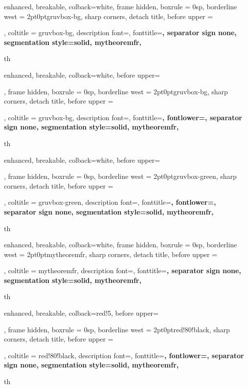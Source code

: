 {
	enhanced,
	breakable,
	colback=white,
	frame hidden,
	boxrule = 0sp,
	borderline west = {2pt}{0pt}{gruvbox-bg},
	sharp corners,
	detach title,
	before upper = \tcbtitle\par\smallskip,
	coltitle = gruvbox-bg,
	description font=\mdseries{}\selectfont,
	fonttitle=\selectfont\bfseries,
	separator sign none,
	segmentation style={solid, mytheoremfr},
}
{th}


{
	enhanced,
	breakable,
	colback=white,
  before upper=\tcbtitle\par\Hugeskip,
	frame hidden,
	boxrule = 0sp,
	borderline west = {2pt}{0pt}{gruvbox-bg},
	sharp corners,
	detach title,
	before upper = \tcbtitle\par\smallskip,
	coltitle = gruvbox-bg,
	description font=\mdseries{}\selectfont,
	fonttitle=\selectfont\bfseries,
	fontlower=\selectfont,
  separator sign none,
	segmentation style={solid, mytheoremfr},
}
{th}

{
	enhanced,
	breakable,
	colback=white,
  before upper=\tcbtitle\par\Hugeskip,
	frame hidden,
	boxrule = 0sp,
	borderline west = {2pt}{0pt}{gruvbox-green},
	sharp corners,
	detach title,
	before upper = \tcbtitle\par\smallskip,
	coltitle = gruvbox-green,
	description font=\mdseries{}\selectfont,
	fonttitle=\selectfont\bfseries,
	fontlower=\selectfont,
  separator sign none,
	segmentation style={solid, mytheoremfr},
}
{th}

{
	enhanced,
	breakable,
	colback=white,
	frame hidden,
	boxrule = 0sp,
	borderline west = {2pt}{0pt}{mytheoremfr},
	sharp corners,
	detach title,
	before upper = \tcbtitle\par\smallskip,
	coltitle = mytheoremfr,
	description font=\selectfont,
	fonttitle=\selectfont\bfseries,
	separator sign none,
	segmentation style={solid, mytheoremfr},
}
{th}

{
enhanced,
breakable,
colback=red!5,
  before upper=\tcbtitle\par\Hugeskip,
frame hidden,
boxrule = 0sp,
borderline west = {2pt}{0pt}{red!80!black},
sharp corners,
detach title,
before upper = \tcbtitle\par\smallskip,
coltitle = red!80!black,
description font=\mdseries{}\selectfont,
fonttitle=\selectfont\bfseries,
fontlower=\selectfont,
  separator sign none,
segmentation style={solid, mytheoremfr},
}
{th}

